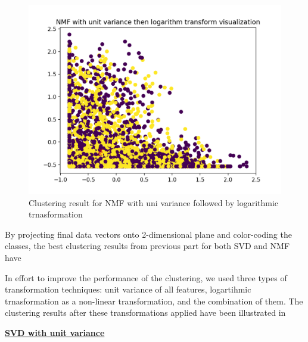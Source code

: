 \documentclass{report}
\begin{document}
\begin{figure}
  \includegraphics[width=\linewidth]{nmf_scale-log_p4.png} 
  \vspace*{-20mm}
  \caption{Clustering result for NMF with uni variance followed by logarithmic trnasformation}
  \label{fig:nmf5}
\end{figure}


By projecting final data vectors onto 2-dimensional plane and color-coding the classes, the best clustering results from previous part for both SVD and NMF have %

In effort to improve the performance of the clustering, we used three types of transformation techniques: unit variance of all features, logartihmic trnasformation as a non-linear transformation, and the combination of them. The clustering results after these transformations applied have been illustrated in %



\underline{\textbf{SVD with unit variance}} 
\end{document}
